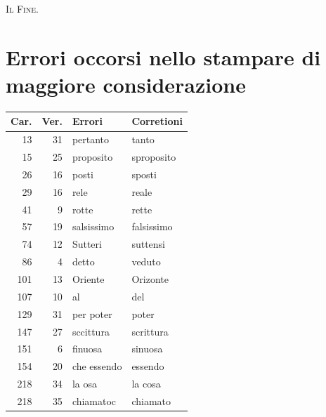 \documentclass[11pt,twoside,openany]{book}
\begin{document}
\begin{center}\textsc{Il Fine.}\end{center}


\backmatter
\chapter*{Errori occorsi nello stampare di maggiore considerazione}



\bigskip
\begin{center}
\begin{tabular}{rrll}
\toprule

\textbf{Car.} & \textbf{Ver.} & \textbf{Errori} & \textbf{Corretioni} \\
\midrule

13 & 31 & pertanto & tanto \\

15 & 25 & proposito & sproposito \\

26 & 16 & posti & sposti \\

29 & 16 & rele & reale \\

41 & 9 & rotte & rette \\

57 & 19 & salsissimo & falsissimo \\

74 & 12 & Sutteri & suttensi \\

86 & 4 & detto & veduto \\

101 & 13 & Oriente & Orizonte \\

107 & 10 & al & del \\

129 & 31 & per poter & poter \\

147 & 27 & sccittura & scrittura \\

151 & 6 & finuosa & sinuosa \\

154 & 20 & che essendo & essendo \\

218 & 34 & la osa & la cosa \\

218 & 35 & chiamatoc & chiamato \\

\bottomrule
\end{tabular}
\end{center}
\end{document}
